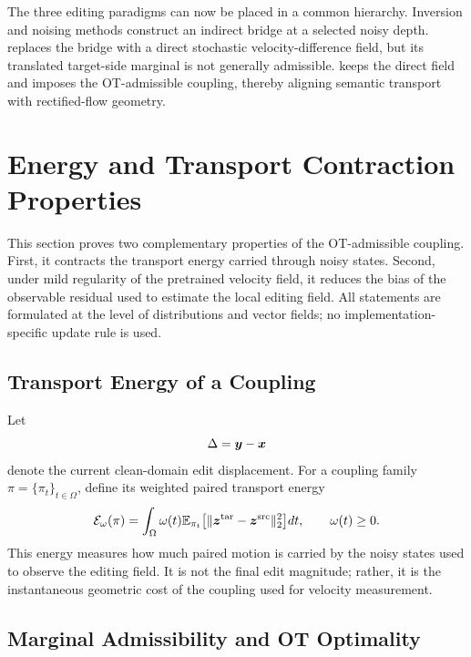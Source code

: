 The three editing paradigms can now be placed in a common hierarchy.
Inversion and noising methods construct an indirect bridge at a selected noisy depth.
\method replaces the bridge with a direct stochastic velocity-difference field, but its translated target-side marginal is not generally admissible.
\methodplus keeps the direct field and imposes the OT-admissible coupling, thereby aligning semantic transport with rectified-flow geometry.

\section{Energy and Transport Contraction Properties}
\label{app:contraction_properties}

This section proves two complementary properties of the OT-admissible coupling.
First, it contracts the transport energy carried through noisy states.
Second, under mild regularity of the pretrained velocity field, it reduces the bias of the observable residual used to estimate the local editing field.
All statements are formulated at the level of distributions and vector fields; no implementation-specific update rule is used.

\subsection{Transport Energy of a Coupling}

Let
\begin{equation}
    \label{eq:app_delta_def}
    \Delta=\boldsymbol{y}-\boldsymbol{x}
\end{equation}
denote the current clean-domain edit displacement.
For a coupling family $\pi=\{\pi_t\}_{t\in\Omega}$, define its weighted paired transport energy
\begin{equation}
    \label{eq:app_weighted_transport_energy}
    \mathcal{E}_{\omega}(\pi)
    =
    \int_{\Omega}
    \omega(t)
    \mathbb{E}_{\pi_t}
    \big[
    \|\boldsymbol{z}^{\mathrm{tar}}-\boldsymbol{z}^{\mathrm{src}}\|_2^2
    \big]dt,
    \qquad
    \omega(t)\ge 0.
\end{equation}
This energy measures how much paired motion is carried by the noisy states used to observe the editing field.
It is not the final edit magnitude; rather, it is the instantaneous geometric cost of the coupling used for velocity measurement.

\subsection{Marginal Admissibility and OT Optimality}

